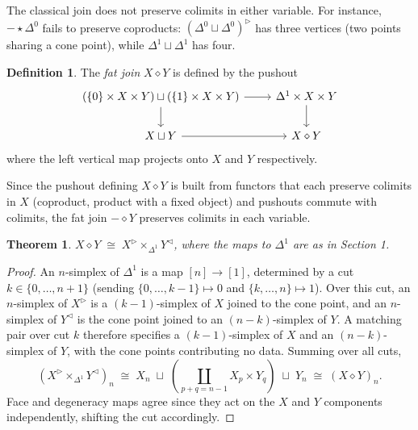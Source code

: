 \documentclass{article}
\newtheorem{theorem}[proposition]{Theorem}
\theoremstyle{definition}
\newtheorem{definition}[proposition]{Definition}
\begin{document}
The classical join does not preserve colimits in either variable. For instance, $- \star \Delta^0$ fails to preserve coproducts: $(\Delta^0 \sqcup \Delta^0)^\triangleright$ has three vertices (two points sharing a cone point), while $\Delta^1 \sqcup \Delta^1$ has four.

\begin{definition}\label{fat-join}
	The \emph{fat join} $X \diamond Y$ is defined by the pushout
	\[\begin{tikzcd}[ampersand replacement=\&]
		{(\{0\} \times X \times Y) \sqcup (\{1\} \times X \times Y)} \& {\Delta^1 \times X \times Y} \\
		{X \sqcup Y} \& {X \diamond Y}
		\arrow[from=1-1, to=1-2]
		\arrow[from=1-1, to=2-1]
		\arrow[from=1-2, to=2-2]
		\arrow[from=2-1, to=2-2]
	\end{tikzcd}\]
	where the left vertical map projects onto $X$ and $Y$ respectively.
\end{definition}

Since the pushout defining $X \diamond Y$ is built from functors that each preserve colimits in $X$ (coproduct, product with a fixed object) and pushouts commute with colimits, the fat join $- \diamond Y$ preserves colimits in each variable.

\begin{theorem}\label{fat-join-pullback}
	$X \diamond Y \;\cong\; X^\triangleright \times_{\Delta^1} Y^\triangleleft$, where the maps to $\Delta^1$ are as in Section 1.
\end{theorem}

\begin{proof}
	An $n$-simplex of $\Delta^1$ is a map $[n] \to [1]$, determined by a cut $k \in \{0,\ldots,n{+}1\}$ (sending $\{0,\ldots,k{-}1\} \mapsto 0$ and $\{k,\ldots,n\} \mapsto 1$). Over this cut, an $n$-simplex of $X^\triangleright$ is a $(k{-}1)$-simplex of $X$ joined to the cone point, and an $n$-simplex of $Y^\triangleleft$ is the cone point joined to an $(n{-}k)$-simplex of $Y$. A matching pair over cut $k$ therefore specifies a $(k{-}1)$-simplex of $X$ and an $(n{-}k)$-simplex of $Y$, with the cone points contributing no data. Summing over all cuts,
	\[(X^\triangleright \times_{\Delta^1} Y^\triangleleft)_n \;\cong\; X_n \;\sqcup\; \left(\coprod_{p+q=n-1} X_p \times Y_q\right) \;\sqcup\; Y_n \;\cong\; (X \diamond Y)_n.\]
	Face and degeneracy maps agree since they act on the $X$ and $Y$ components independently, shifting the cut accordingly.
\end{proof}
\end{document}
